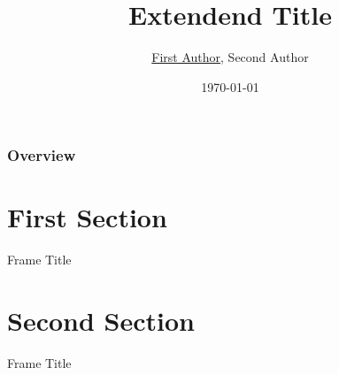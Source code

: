 \documentclass[pdf,xcolor=table]{beamer}
\title[PreviewTitle]{Extendend Title }
\author[First, Second]{\underline{First Author}, Second Author}
\institute[AAU]{Alpen-Adria-Universität Klagenfurt}
\date{\today}
\begin{document}
\maketitle
\usebackgroundtemplate{}

\begin{frame}
\frametitle{Overview}
\hfill
\parbox[t]{.96\textwidth}{
  \begin{minipage}[c][0.65\textheight]{\textwidth}
  \tableofcontents
  \end{minipage}
}
\end{frame}
\section{First Section}
\begin{frame}{Frame Title}

\end{frame}

\section{Second Section}
\begin{frame}{Frame Title}

\end{frame}
\end{document}
